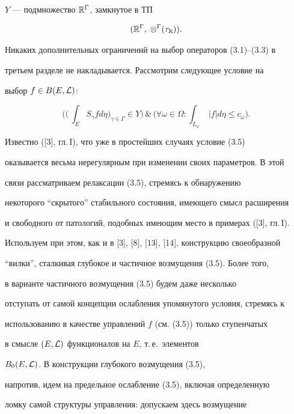 $Y$ --- подмножество $\Bbb R^\Gamma$, замкнутое в ТП


\begin{equation}


(\Bbb R^\Gamma,\;\otimes^\Gamma(\tau_{\Bbb R})).


\end{equation}


Никаких дополнительных ограничений на выбор операторов (3.1)--(3.3) в


третьем разделе не накладывается. Рассмотрим следующее условие на


выбор $f\in B(E,\cal L)$:


\begin{equation}


\bigg(\Big(\,\int_E S_\gamma f d\eta\Big)_{\gamma\in\Gamma}\in Y\bigg)\, \&\,


\bigg(\forall\omega\in\Omega:\int_{L_\omega}\;|f|d\eta\le c_\omega\bigg).


\end{equation}


Известно ([3], гл.\,I), что уже в простейших случаях условие (3.5)


оказывается весьма нерегулярным при изменении своих параметров. В этой


связи рассматриваем релаксации (3.5), стремясь к обнаружению


некоторого ``скрытого'' стабильного состояния, имеющего смысл расширения


и свободного от патологий, подобных имеющим место в примерах ([3], гл.\,I).


Используем при этом, как и в [3], [8], [13], [14], конструкцию своеобразной


``вилки'', сталкивая глубокое и частичное возмущения (3.5). Более того,


в варианте частичного возмущения (3.5) будем даже несколько


отступать от самой концепции ослабления упомянутого условия, стремясь к


использованию в качестве управлений $f$ (см. (3.5)) только ступенчатых


в смысле $(E,\cal L)$ функционалов на $E$, т.\,е.~элементов


$B_0(E,\cal L)$. В конструкции глубокого возмущения (3.5),


напротив, идем на предельное ослабление (3.5), включая определенную


ломку самой структуры управления: допускаем здесь возмущение


